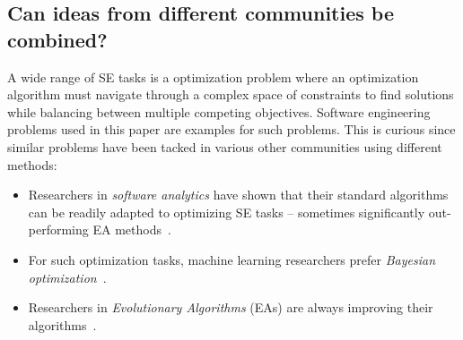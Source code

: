 \subsection{Can ideas from different communities be combined?}
A wide range 
of SE tasks is a optimization  problem where an optimization algorithm must navigate
through a complex space of constraints to find solutions while balancing between multiple competing objectives. Software engineering problems used in this paper are examples for such problems.
This is curious since similar problems have been tacked in various other communities using different methods:
\begin{itemize}[leftmargin=*]
\item
Researchers in \textit{software analytics} have shown
that their standard algorithms can be readily adapted
to optimizing SE tasks -- sometimes significantly out-performing  EA methods~\cite{krall2015gale,nair17,Nair2016}.
\item
For such optimization tasks, machine learning researchers prefer \textit{Bayesian optimization}~\cite{bpo1,bpo2,zuluaga2013active}.
\item
Researchers in \textit{Evolutionary Algorithms} (EAs)
are always improving their  algorithms~\cite{deb2002fast,deb2014evolutionary,zhang2007moea}.
\end{itemize}

